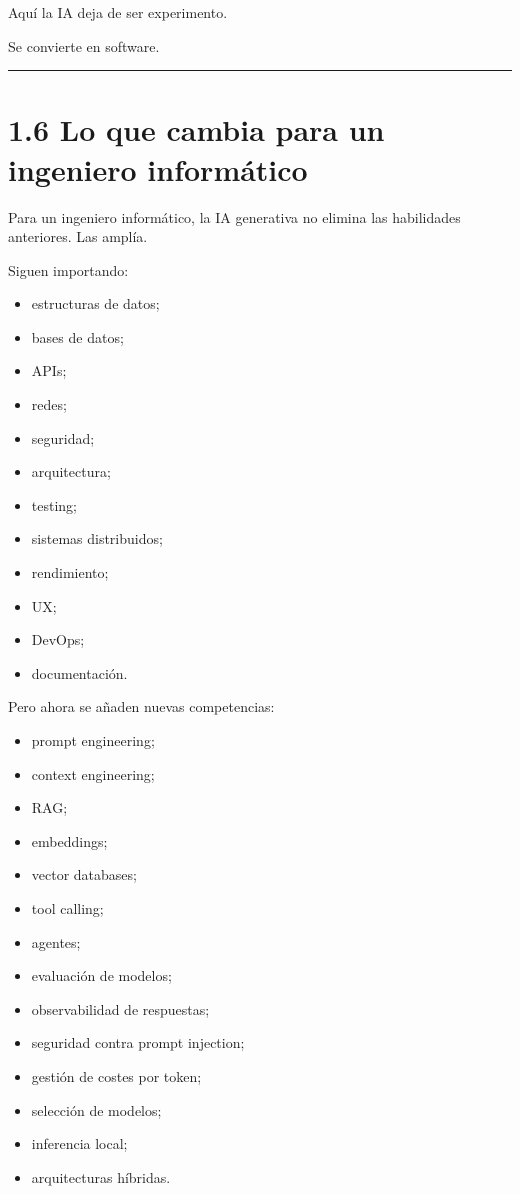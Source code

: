 Aquí la IA deja de ser experimento.

Se convierte en software.

\begin{center}\rule{0.5\linewidth}{0.5pt}\end{center}

\section{1.6 Lo que cambia para un ingeniero
informático}\label{lo-que-cambia-para-un-ingeniero-informuxe1tico}

Para un ingeniero informático, la IA generativa no elimina las
habilidades anteriores. Las amplía.

Siguen importando:

\begin{itemize}
\tightlist
\item
  estructuras de datos;
\item
  bases de datos;
\item
  APIs;
\item
  redes;
\item
  seguridad;
\item
  arquitectura;
\item
  testing;
\item
  sistemas distribuidos;
\item
  rendimiento;
\item
  UX;
\item
  DevOps;
\item
  documentación.
\end{itemize}

Pero ahora se añaden nuevas competencias:

\begin{itemize}
\tightlist
\item
  prompt engineering;
\item
  context engineering;
\item
  RAG;
\item
  embeddings;
\item
  vector databases;
\item
  tool calling;
\item
  agentes;
\item
  evaluación de modelos;
\item
  observabilidad de respuestas;
\item
  seguridad contra prompt injection;
\item
  gestión de costes por token;
\item
  selección de modelos;
\item
  inferencia local;
\item
  arquitecturas híbridas.
\end{itemize}

